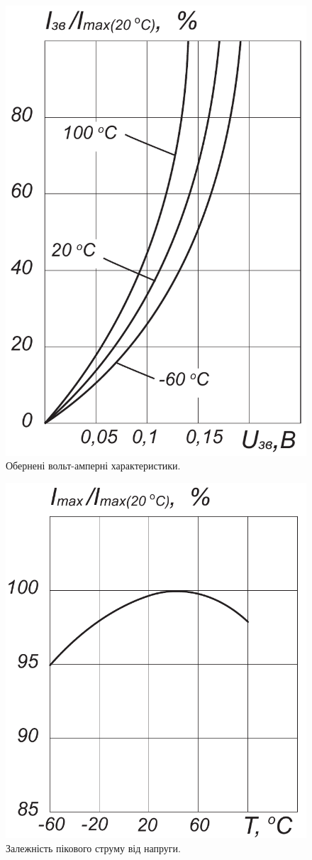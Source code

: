 \documentclass[a4paper,14pt]{extreport}
\begin{document}
\begin{figure}[h!]
\begin{minipage}[h]{0.43\linewidth}
    \includegraphics[width=1\linewidth]{1.5.7.pdf}
    \caption{Обернені вольт-амперні характеристики.}
  \end{minipage}
\end{figure}

\begin{figure}[h!]\label{im10}
  \begin{center}
    \includegraphics[width=0.44\linewidth]{1.5.8.pdf}
    \caption{Залежність пікового струму від напруги.}
  \end{center}
\end{figure}
\end{document}
